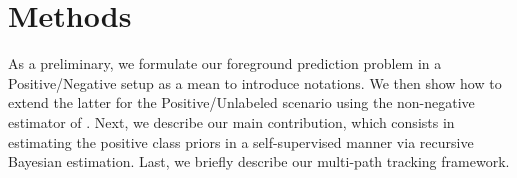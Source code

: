 \section{Methods}
\label{sec:methods}
As a preliminary, we formulate our foreground prediction problem in a Positive/Negative setup as a mean to introduce notations.
We then show how to extend the latter for the Positive/Unlabeled scenario using the non-negative estimator of \cite{kiryo17}.
Next, we describe our main contribution, which consists in estimating the positive class priors in a self-supervised manner via recursive Bayesian estimation.
Last, we briefly describe our multi-path tracking framework.







